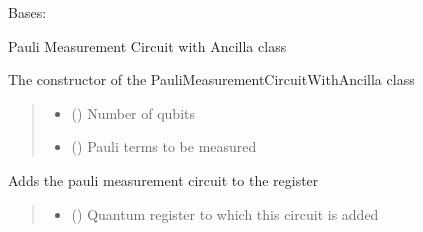 \documentclass[letterpaper,10pt,english]{sphinxmanual}
\begin{document}
\begin{fulllineitems}
\label{\detokenize{qcompute_qapp.circuit:qcompute_qapp.circuit.PauliMeasurementCircuitWithAncilla}}
\pysigstartsignatures
{}
\pysigstopsignatures
\sphinxAtStartPar
Bases: {\hyperref[\detokenize{qcompute_qapp.circuit:qcompute_qapp.circuit.BasicCircuit}]{}}

\sphinxAtStartPar
Pauli Measurement Circuit with Ancilla class

\sphinxAtStartPar
The constructor of the PauliMeasurementCircuitWithAncilla class
\begin{quote}\begin{description}
\begin{itemize}
\item {} 
\sphinxAtStartPar
{} () \textendash{} Number of qubits

\item {} 
\sphinxAtStartPar
{} () \textendash{} Pauli terms to be measured

\end{itemize}

\end{description}\end{quote}

\begin{fulllineitems}
\label{\detokenize{qcompute_qapp.circuit:qcompute_qapp.circuit.PauliMeasurementCircuitWithAncilla.add_circuit}}
\pysigstartsignatures
{}
\pysigstopsignatures
\sphinxAtStartPar
Adds the pauli measurement circuit to the register
\begin{quote}\begin{description}
\begin{itemize}
\item {} 
\sphinxAtStartPar
{} () \textendash{} Quantum register to which this circuit is added


\end{itemize}
\end{description}
\end{quote}
\end{fulllineitems}
\end{fulllineitems}
\end{document}
